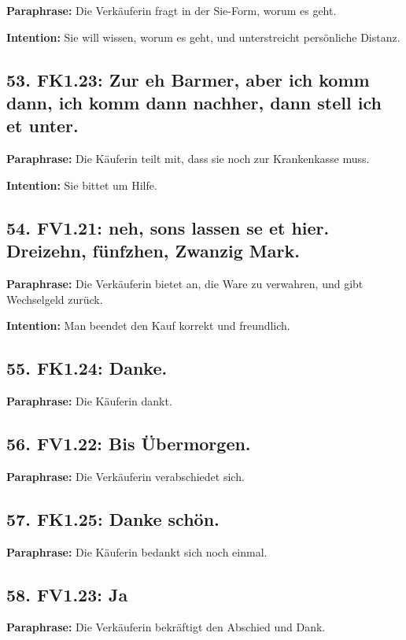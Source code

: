 \documentclass[11pt]{article}
\begin{document}
\textbf{Paraphrase:} Die Verkäuferin fragt in der Sie-Form, worum es geht.

\textbf{Intention:} Sie will wissen, worum es geht, und unterstreicht persönliche Distanz.

\subsection*{53. FK1.23: Zur eh Barmer, aber ich komm dann, ich komm dann nachher, dann stell ich et unter.}

\textbf{Paraphrase:} Die Käuferin teilt mit, dass sie noch zur Krankenkasse muss.

\textbf{Intention:} Sie bittet um Hilfe.

\subsection*{54. FV1.21: neh, sons lassen se et hier. Dreizehn, fünfzhen, Zwanzig Mark.}

\textbf{Paraphrase:} Die Verkäuferin bietet an, die Ware zu verwahren, und gibt Wechselgeld zurück.

\textbf{Intention:} Man beendet den Kauf korrekt und freundlich.

\subsection*{55. FK1.24: Danke.}

\textbf{Paraphrase:} Die Käuferin dankt.

\subsection*{56. FV1.22: Bis Übermorgen.}

\textbf{Paraphrase:} Die Verkäuferin verabschiedet sich.

\subsection*{57. FK1.25: Danke schön.}

\textbf{Paraphrase:} Die Käuferin bedankt sich noch einmal.

\subsection*{58. FV1.23: Ja}

\textbf{Paraphrase:} Die Verkäuferin bekräftigt den Abschied und Dank.
\end{document}
